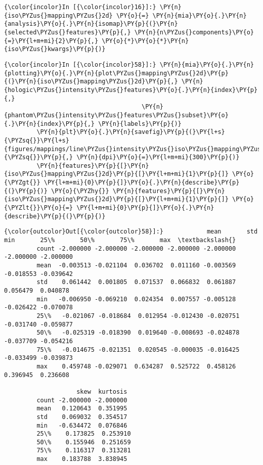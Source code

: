     \begin{Verbatim}[commandchars=\\\{\}]
{\color{incolor}In [{\color{incolor}16}]:} \PY{n}{iso\PYZus{}mapping\PYZus{}2d} \PY{o}{=} \PY{n}{mia}\PY{o}{.}\PY{n}{analysis}\PY{o}{.}\PY{n}{isomap}\PY{p}{(}\PY{n}{selected\PYZus{}features}\PY{p}{,} \PY{n}{n\PYZus{}components}\PY{o}{=}\PY{l+m+mi}{2}\PY{p}{,} \PY{o}{*}\PY{o}{*}\PY{n}{iso\PYZus{}kwargs}\PY{p}{)}
\end{Verbatim}

    \begin{Verbatim}[commandchars=\\\{\}]
{\color{incolor}In [{\color{incolor}58}]:} \PY{n}{mia}\PY{o}{.}\PY{n}{plotting}\PY{o}{.}\PY{n}{plot\PYZus{}mapping\PYZus{}2d}\PY{p}{(}\PY{n}{iso\PYZus{}mapping\PYZus{}2d}\PY{p}{,} \PY{n}{hologic\PYZus{}intensity\PYZus{}features}\PY{o}{.}\PY{n}{index}\PY{p}{,}
                                      \PY{n}{phantom\PYZus{}intensity\PYZus{}features\PYZus{}subset}\PY{o}{.}\PY{n}{index}\PY{p}{,} \PY{n}{labels}\PY{p}{)}
         \PY{n}{plt}\PY{o}{.}\PY{n}{savefig}\PY{p}{(}\PY{l+s}{\PYZsq{}}\PY{l+s}{figures/mappings/line\PYZus{}intensity\PYZus{}iso\PYZus{}mapping\PYZus{}2d.png}\PY{l+s}{\PYZsq{}}\PY{p}{,} \PY{n}{dpi}\PY{o}{=}\PY{l+m+mi}{300}\PY{p}{)}
         \PY{n}{features}\PY{p}{[}\PY{n}{iso\PYZus{}mapping\PYZus{}2d}\PY{p}{[}\PY{l+m+mi}{1}\PY{p}{]} \PY{o}{\PYZgt{}} \PY{l+m+mi}{0}\PY{p}{]}\PY{o}{.}\PY{n}{describe}\PY{p}{(}\PY{p}{)} \PY{o}{\PYZhy{}} \PY{n}{features}\PY{p}{[}\PY{n}{iso\PYZus{}mapping\PYZus{}2d}\PY{p}{[}\PY{l+m+mi}{1}\PY{p}{]} \PY{o}{\PYZlt{}}\PY{o}{=} \PY{l+m+mi}{0}\PY{p}{]}\PY{o}{.}\PY{n}{describe}\PY{p}{(}\PY{p}{)}
\end{Verbatim}

            \begin{Verbatim}[commandchars=\\\{\}]
{\color{outcolor}Out[{\color{outcolor}58}]:}            mean       std       min       25\%       50\%       75\%       max  \textbackslash{}
         count -2.000000 -2.000000 -2.000000 -2.000000 -2.000000 -2.000000 -2.000000
         mean  -0.003513 -0.021104  0.036702  0.011160 -0.003569 -0.018553 -0.039642
         std    0.061442  0.001805  0.071537  0.066832  0.061887  0.056479  0.040878
         min   -0.006950 -0.069210  0.024354  0.007557 -0.005128 -0.026422 -0.070078
         25\%   -0.021067 -0.018684  0.012954 -0.012430 -0.020751 -0.031740 -0.059877
         50\%   -0.025319 -0.018390  0.019640 -0.008693 -0.024878 -0.037709 -0.054216
         75\%   -0.014675 -0.021351  0.020545 -0.000035 -0.016425 -0.033499 -0.039873
         max    0.459748 -0.029071  0.634287  0.525722  0.458126  0.396945  0.236608

                    skew  kurtosis
         count -2.000000 -2.000000
         mean   0.120643  0.351995
         std    0.069032  0.354517
         min   -0.634472  0.076846
         25\%    0.173825  0.253910
         50\%    0.155946  0.251659
         75\%    0.116317  0.313281
         max    0.183788  3.838945
\end{Verbatim}

